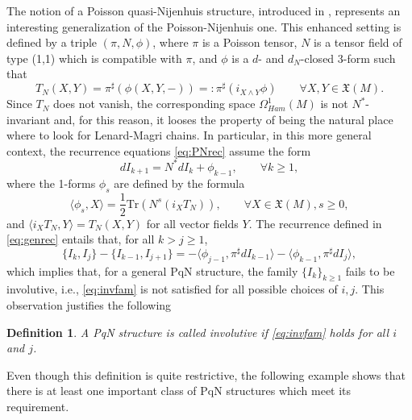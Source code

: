 \documentclass[12pt]{article}
\newtheorem{defi}[theorem]{Definition}
\newtheorem{remark}[theorem]{Remark}
\begin{document}
The notion of a Poisson quasi-Nijenhuis structure, introduced in \cite{SX}, represents an interesting generalization of the Poisson-Nijenhuis one. This enhanced setting is defined by a triple $(\pi,N,\phi)$, where $\pi$ is a Poisson tensor, 
$N$ is a tensor field of type (1,1) which is compatible with $\pi$, and $\phi$ is a $d$- and $d_N$-closed 3-form such that 
\begin{equation}
T_N(X,Y)=\pi^\sharp(\phi(X,Y,-))=:\pi^\sharp (i_{X\wedge Y}\phi)%
\qquad\forall X,Y\in\mathfrak X(M).\label{eq:PqNtor}
\end{equation}
Since $T_N$ does not vanish,  the corresponding space $\Omega_{Ham}^1(M)$ is not $N^\ast$-invariant and, for this reason, it looses the property of being the natural place where to look for Lenard-Magri chains. In particular, in this more general context, the recurrence equations \eqref{eq:PNrec} assume the form
\begin{equation}
dI_{k+1}=N^\ast dI_k+\phi_{k-1},\qquad\forall k\geq 1,\label{eq:genrec}
\end{equation}
where the 1-forms $\phi_s$ are defined by the formula
\begin{equation}
\langle\phi_s,X\rangle=\frac{1}{2}\text{Tr}(N^s(i_XT_N)),\qquad\forall X\in\mathfrak X(M), s\geq 0, \label{eq:phis}
\end{equation}
and $\langle i_XT_N,Y\rangle=T_N(X,Y)$ for all vector fields $Y$. The recurrence defined in \eqref{eq:genrec} entails that, for all $k>j\geq 1$,
\begin{equation}
\{I_k,I_j\}-\{I_{k-1},I_{j+1}\}=-\langle\phi_{j-1},\pi^\sharp dI_{k-1}\rangle-\langle\phi_{k-1},\pi^\sharp dI_j\rangle,\label{eq:recursionphi}
\end{equation}
which implies that, for a general PqN structure, the family $\{I_k\}_{k\geq 1}$ fails to be 
involutive, i.e., \eqref{eq:invfam} is not satisfied for all possible choices of $i,j$. This observation justifies the following

\begin{defi}\label{def:invpqn}
A PqN structure is called involutive if \eqref{eq:invfam} holds for all $i$ and $j$.
\end{defi}

Even though this definition is quite restrictive, the following example shows that there is at least one important class of PqN structures which meet its requirement.
\end{document}

